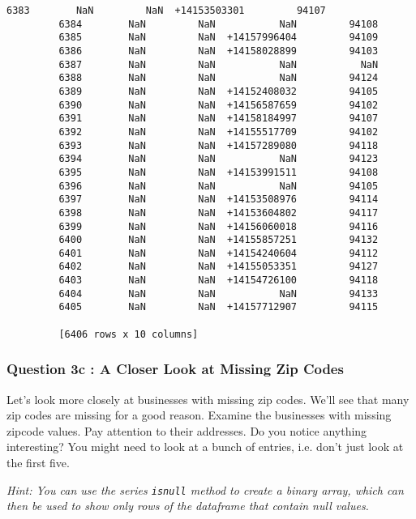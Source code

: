 \documentclass[11pt]{article}
\begin{document}
\begin{Verbatim}[commandchars=\\\{\}]
         6383        NaN         NaN  +14153503301         94107  
         6384        NaN         NaN           NaN         94108  
         6385        NaN         NaN  +14157996404         94109  
         6386        NaN         NaN  +14158028899         94103  
         6387        NaN         NaN           NaN           NaN  
         6388        NaN         NaN           NaN         94124  
         6389        NaN         NaN  +14152408032         94105  
         6390        NaN         NaN  +14156587659         94102  
         6391        NaN         NaN  +14158184997         94107  
         6392        NaN         NaN  +14155517709         94102  
         6393        NaN         NaN  +14157289080         94118  
         6394        NaN         NaN           NaN         94123  
         6395        NaN         NaN  +14153991511         94108  
         6396        NaN         NaN           NaN         94105  
         6397        NaN         NaN  +14153508976         94114  
         6398        NaN         NaN  +14153604802         94117  
         6399        NaN         NaN  +14156060018         94116  
         6400        NaN         NaN  +14155857251         94132  
         6401        NaN         NaN  +14154240604         94112  
         6402        NaN         NaN  +14155053351         94127  
         6403        NaN         NaN  +14154726100         94118  
         6404        NaN         NaN           NaN         94133  
         6405        NaN         NaN  +14157712907         94115  
         
         [6406 rows x 10 columns]
\end{Verbatim}
            
    \subsubsection{Question 3c : A Closer Look at Missing Zip
Codes}\label{question-3c-a-closer-look-at-missing-zip-codes}

Let's look more closely at businesses with missing zip codes. We'll see
that many zip codes are missing for a good reason. Examine the
businesses with missing zipcode values. Pay attention to their
addresses. Do you notice anything interesting? You might need to look at
a bunch of entries, i.e. don't just look at the first five.

\emph{Hint: You can use the series \texttt{isnull} method to create a
binary array, which can then be used to show only rows of the dataframe
that contain null values.}
\end{document}
